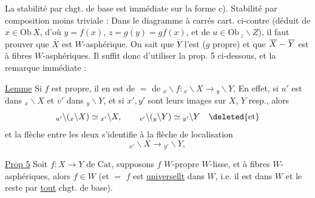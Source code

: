 
La stabilité par chgt. de base est immédiate sur la forme c).  Stabilité par composition moins triviale :  Dans le diagramme à carrés cart. ci-contre (déduit de $x\in\mathrm{Ob}\,X$, d'où $y=f(x)$, $z=g(y)=gf(x)$\deleted{\unsure{)}}, et de $u\in\mathrm{Ob}\,{}_{z}\backslash Z$), il faut prouver que $\overline X$ est $W$-asphérique. On sait que $\overline Y$ l'est ($g$ propre) et que $\overline X\mathrel{\relbar}\overline Y$ est à fibres $W$-asphériques. Il suffit donc d'utiliser la prop. 5 ci-dessous, et la remarque immédiate :

\uline{Lemme} Si $f$ est propre, il en est de $=$ de  $ {}_{x}\backslash f:{}_{x}\backslash X\longrightarrow {}_{y}\backslash Y$,  En effet, si $u'$ est dans $ {}_{x}\backslash X$ et $v'$ dans $ {}_{y}\backslash Y$,  et si $x',y'$ sont leurs images sur $X$, $Y$ resp., alors \[{}_{u'}\backslash({}_{x}\backslash X)\simeq {}_{x'}\backslash X,\qquad {}_{v'}\backslash({}_{y}\backslash Y)\simeq {}_{y'}\backslash Y\quad\deleted{\text{et}}\] et la flèche entre les deux s'identifie à la flèche de localisation \[{}_{x'}\backslash X\longrightarrow {}_{y'}\backslash Y,\]

 \uline{Prop 5} Soit $f:X\longrightarrow Y$ de $\mathrm{Cat}$, supposons $f$ $W$-propre  $W$-lisse, et à fibres $W$-asphériques, alors $f\in W$ (et $=$ $f$ est \uline{universellt} dans $W$, i.e. il est dans $W$ et le reste par \uline{tout} chgt. de base).

